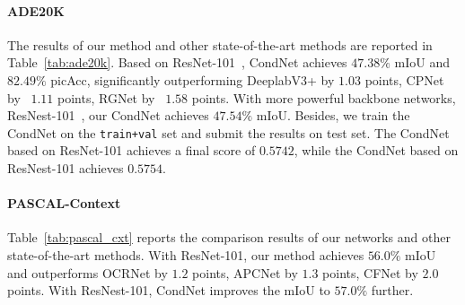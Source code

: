 \documentclass[journal]{IEEEtran}
\begin{document}
\paragraph{ADE20K}
The results of our method 
and other state-of-the-art methods are reported in Table~\ref{tab:ade20k}.
Based on ResNet-101~\cite{He-CVPR-ResNet-2016}, 
CondNet achieves $47.38\%$ mIoU and $82.49\%$ picAcc, 
significantly outperforming 
DeeplabV3+ by $1.03$ points,
CPNet by  $1.11$ points, RGNet by  $1.58$ points.
With more powerful backbone networks, ResNest-101~\cite{Zhang-ARXIV-ResNest-2020}, our CondNet achieves $47.54\%$ mIoU.
Besides,
we train the CondNet on the \texttt{train+val} set 
and submit the results on test set.
The CondNet based on ResNet-101 achieves
a final score of $0.5742$,
while the CondNet based on ResNest-101 achieves
$0.5754$.






\paragraph{PASCAL-Context}
Table~\ref{tab:pascal_cxt} reports the comparison results
of our networks and other state-of-the-art methods.
With ResNet-101, our method achieves $56.0\%$ mIoU
and outperforms 
OCRNet by $1.2$ points, APCNet by $1.3$ points, CFNet by $2.0$ points.
With ResNest-101, CondNet improves the mIoU to $57.0\%$ further.
\end{document}
